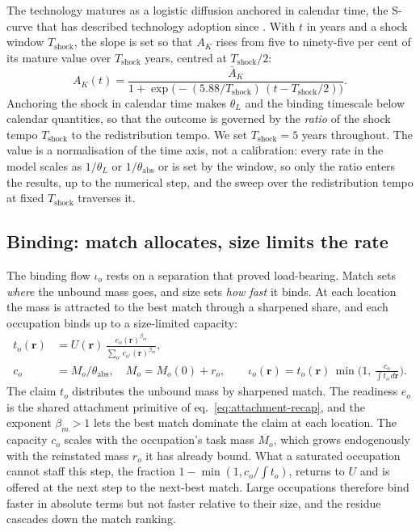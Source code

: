 \documentclass[12pt, a4paper]{article}
\newcommand{\rr}{\mathbf{r}}
\begin{document}
The technology matures as a logistic diffusion anchored in calendar
time, the S-curve that has described technology adoption since
\textcite{griliches1957hybrid}. With $t$ in years and a shock window
$T_{\text{shock}}$, the slope is set
so that $A_K$ rises from five to ninety-five per cent of its mature value
over $T_{\text{shock}}$ years, centred at $T_{\text{shock}}/2$:
\begin{equation}
A_K(t) = \frac{\bar A_K}{1 + \exp\!\big(-(5.88/T_{\text{shock}})\,(t - T_{\text{shock}}/2)\big)}.
\label{eq:maturation}
\end{equation}
Anchoring the shock in calendar time makes $\theta_L$ and the binding
timescale below calendar quantities, so that the outcome is governed by
the \emph{ratio} of the shock tempo $T_{\text{shock}}$ to the
redistribution tempo. We set $T_{\text{shock}} = 5$ years throughout.
The value is a normalisation of the time axis, not a calibration: every
rate in the model scales as $1/\theta_L$ or $1/\theta_{\text{abs}}$ or
is set by the window, so only the ratio enters the results, up to the numerical step, and the
sweep over the redistribution tempo at fixed $T_{\text{shock}}$
traverses it.

\subsection{Binding: match allocates, size limits the rate}
\label{sec:binding}

The binding flow $\iota_o$ rests on a separation that proved
load-bearing. Match sets \emph{where} the unbound mass goes, and size
sets \emph{how fast} it binds. At each location the mass is
attracted to the best match through a sharpened share, and each
occupation binds up to a size-limited capacity:
\begin{align}
t_o(\rr) &= U(\rr)\,
\frac{e_o(\rr)^{\beta_m}}{\sum_{o'} e_{o'}(\rr)^{\beta_m}},
\label{eq:claim}\\[2pt]
c_o &= M_o/\theta_{\text{abs}}, \quad M_o = M_o(0) + r_o,
\qquad
\iota_o(\rr) = t_o(\rr)\,\min\!\Big(1,\,\frac{c_o}{\int t_o\,d\rr}\Big).
\label{eq:cap}
\end{align}
The claim $t_o$ distributes the unbound mass by sharpened match. The
readiness $e_o$ is the shared attachment primitive of
eq.~\eqref{eq:attachment-recap}, and the exponent $\beta_m>1$ lets the
best match dominate the claim at each location. The capacity $c_o$ scales with the occupation's task mass
$M_o$, which grows endogenously with the reinstated mass $r_o$ it has
already bound. What a saturated occupation cannot staff this step, the fraction
$1-\min(1,c_o/\!\int t_o)$, returns to $U$ and is offered at the next
step to the next-best match. Large occupations therefore
bind faster in absolute terms but not faster relative to their size, and
the residue cascades down the match ranking.
\end{document}
